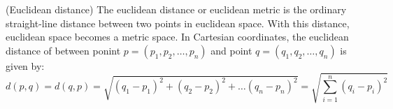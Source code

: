 \theoremstyle{definition}
\begin{definition}{(Euclidean distance)} \cite{eucledianDistance}
	The euclidean distance or euclidean metric is the ordinary straight-line distance between two points in euclidean space. With this distance, euclidean space becomes a metric space. In Cartesian coordinates, the euclidean distance of between ponint $p=(p_1, p_2, \dots, p_n)$ and point $q=(q_1, q_2, \dots, q_n)$ is given by:
	\begin{equation}
		d(p,q) = d(q,p) = \sqrt{(q_1 - p_1)^2 + (q_2 - p_2)^2 + \dots (q_n - p_n)^2} = \sqrt{\sum_{i=1}^{n} (q_i - p_i)^2}
	\end{equation}
\end{definition}


%
 